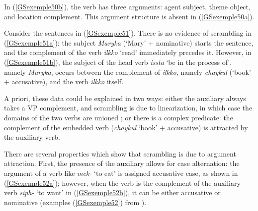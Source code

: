 {    \label{GSexemple50b}
\zl

In (\ref{GSexemple50b}), the verb has three arguments: agent subject, theme object, and location complement. This argument structure is absent in (\ref{GSexemple50a}).

Consider the sentences in (\ref{GSexemple51}). There is no evidence of scrambling in (\ref{GSexemple51a}): the subject \emph{Maryka} (`Mary' + nominative) starts the sentence, and the complement of the verb \emph{ilkko} `read' immediately precedes it. However, in (\ref{GSexemple51b}), the subject of the head verb \emph{issta} `be in the process of', namely \emph{Maryka}, occurs between the complement of \emph{ilkko}, namely \emph{chaykul} (`book' + accusative), and the verb \emph{ilkko} itself.
\eal
	\label{GSexemple51}
	\label{GSexemple51a}
		
	\label{GSexemple51b}

\zl

A priori, these data could be explained in two ways: either the auxiliary always takes a VP complement, and scrambling is due to linearization, in which case the domains of the two verbs are unioned \citep{Reape94a}; or there is a complex predicate: the complement of the embedded verb (\emph{chaykul} `book' + accusative) is attracted by the auxiliary verb. 

There are several properties which show that scrambling is due to argument attraction. First, the presence of the auxiliary allows for case alternation: the argument of a verb like \emph{mek-} `to eat' is assigned accusative case, as shown in (\ref{GSexemple52a}); however, when the verb is the complement of the auxiliary verb \emph{siph-} `to want' in (\ref{GSexemple52b}), it can be either accusative or nominative (examples (\ref{GSexemple52}) from \citealt[87]{Kim2016a-u}).

}
